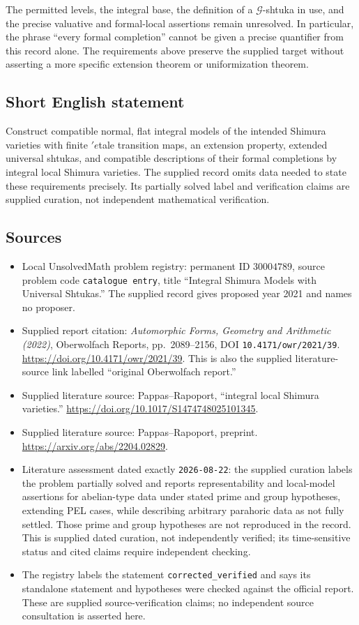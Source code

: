 \documentclass[11pt]{article}
\begin{document}
The permitted levels, the integral base, the definition of a \(\mathcal G\)-shtuka in use, and the precise valuative and formal-local assertions remain unresolved. In particular, the phrase ``every formal completion'' cannot be given a precise quantifier from this record alone. The requirements above preserve the supplied target without asserting a more specific extension theorem or uniformization theorem.
\subsection{Short English statement}
Construct compatible normal, flat integral models of the intended Shimura varieties with finite \('{e}\)tale transition maps, an extension property, extended universal shtukas, and compatible descriptions of their formal completions by integral local Shimura varieties. The supplied record omits data needed to state these requirements precisely. Its partially solved label and verification claims are supplied curation, not independent mathematical verification.
\subsection{Sources}
\begin{itemize}
\item Local UnsolvedMath problem registry: permanent ID \(30004789\), source problem code \texttt{catalogue entry}, title ``Integral Shimura Models with Universal Shtukas.'' The supplied record gives proposed year 2021 and names no proposer.
\item Supplied report citation: \emph{Automorphic Forms, Geometry and Arithmetic (2022)}, Oberwolfach Reports, pp.~2089--2156, DOI \texttt{10.4171/owr/2021/39}. \url{https://doi.org/10.4171/owr/2021/39}. This is also the supplied literature-source link labelled ``original Oberwolfach report.''
\item Supplied literature source: Pappas--Rapoport, ``integral local Shimura varieties.'' \url{https://doi.org/10.1017/S1474748025101345}.
\item Supplied literature source: Pappas--Rapoport, preprint. \url{https://arxiv.org/abs/2204.02829}.
\item Literature assessment dated exactly \texttt{2026-08-22}: the supplied curation labels the problem partially solved and reports representability and local-model assertions for abelian-type data under stated prime and group hypotheses, extending PEL cases, while describing arbitrary parahoric data as not fully settled. Those prime and group hypotheses are not reproduced in the record. This is supplied dated curation, not independently verified; its time-sensitive status and cited claims require independent checking.
\item The registry labels the statement \texttt{corrected\_verified} and says its standalone statement and hypotheses were checked against the official report. These are supplied source-verification claims; no independent source consultation is asserted here.
\end{itemize}
\end{document}
